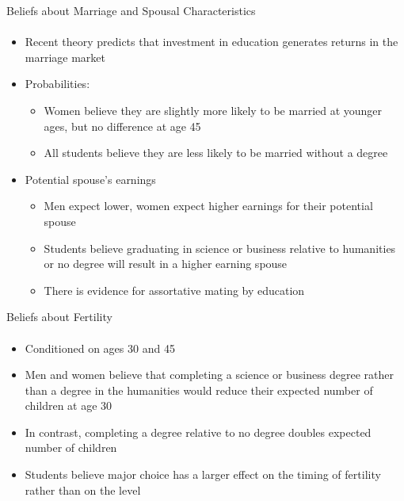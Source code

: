 \documentclass[12pt]{beamer}
\begin{document}
\begin{frame}{Beliefs about Marriage and Spousal Characteristics}
    \framesubtitle{} 
    \begin{itemize}
        \item Recent theory predicts that investment in education generates returns in the marriage market
        \item Probabilities: 
        \begin{itemize}
            \item Women believe they are slightly more likely to be married at younger ages, but no difference at age 45
            \item All students believe they are less likely to be married without a degree
        \end{itemize}
        \item Potential spouse's earnings
        \begin{itemize}
            \item Men expect lower, women expect higher earnings for their potential spouse
            \item Students believe graduating in science or business relative to humanities or no degree will result in a higher earning spouse
            \item There is evidence for assortative mating by education
        \end{itemize}
    \end{itemize}
\end{frame}

\begin{frame}{Beliefs about Fertility}
    \framesubtitle{} 
    \begin{itemize}
        \item Conditioned on ages 30 and 45
        \item Men and women believe that completing a science or business degree rather than a degree in the humanities would reduce their expected number of children at age 30
        \item In contrast, completing a degree relative to no degree doubles expected number of children
        \item Students believe major choice has a larger effect on the timing of fertility rather than on the level
    \end{itemize}
\end{frame}
\end{document}
